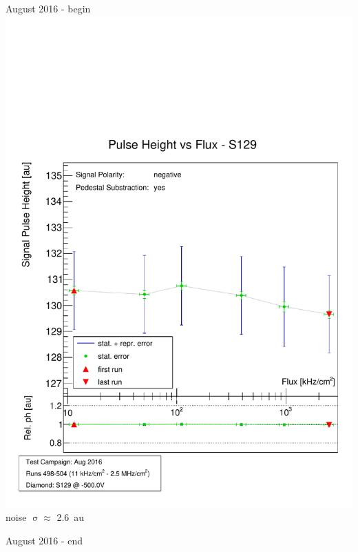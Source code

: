 \documentclass[9pt]{beamer}
\begin{document}
\begin{frame}
\begin{minipage}{\sp}
		\centering
		August 2016 - begin
		\includegraphics[width=\sp]{CPH1510_08_1}\\
		noise $\upsigma\approx$ \SI{2.6}{au}
	\end{minipage}
	\hspace*{2pt}
	\begin{minipage}{\sp}
		\centering
		August 2016 - end

\end{minipage}
\end{frame}
\end{document}
